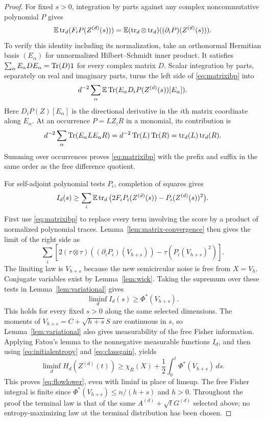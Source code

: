 \begin{proof}
For fixed $s>0$, integration by parts against any complex
noncommutative polynomial $P$ gives
\begin{equation}\label{eq:matrixibp}
 \mathbb E\operatorname{tr}_d(F_i P(Z^{(d)}(s)))
 =\mathbb E(\operatorname{tr}_d\otimes\operatorname{tr}_d)((\partial_iP)(Z^{(d)}(s))).
\end{equation}
To verify this identity including its normalization, take an orthonormal
Hermitian basis $(E_\alpha)$ for unnormalized Hilbert--Schmidt inner
product. It satisfies
$\sum_\alpha E_\alpha D E_\alpha=\operatorname{Tr}(D)1$ for every complex matrix $D$.
Scalar integration by parts, separately on real and imaginary parts,
turns the left side of \eqref{eq:matrixibp} into
\[
 d^{-2}\sum_\alpha\mathbb E\operatorname{Tr}(E_\alpha D_iP(Z^{(d)}(s))[E_\alpha]).
\]
Here $D_iP(Z)[E_\alpha]$ is the directional derivative in the $i$th
matrix coordinate along $E_\alpha$.
At an occurrence $P=LZ_iR$ in a monomial, its contribution is
\[
 d^{-2}\sum_\alpha\operatorname{Tr}(E_\alpha L E_\alpha R)
 =d^{-2}\operatorname{Tr}(L)\operatorname{Tr}(R)=\operatorname{tr}_d(L)\operatorname{tr}_d(R).
\]
Summing over occurrences proves \eqref{eq:matrixibp} with the prefix
and suffix in the same order as the free difference quotient.

For self-adjoint polynomial tests $P_i$, completion of squares gives
\[
 I_d(s)\geq\sum_i\mathbb E\operatorname{tr}_d\big(2F_iP_i(Z^{(d)}(s))
                                  -P_i(Z^{(d)}(s))^2\big).
\]
First use \eqref{eq:matrixibp} to replace every term involving the score
by a product of normalized polynomial traces. Lemma~\ref{lem:matrix-convergence}
then gives the limit of the right side as
\[
 \sum_i\left[2(\tau\otimes\tau)((\partial_iP_i)(V_{h+s}))
                         -\tau(P_i(V_{h+s})^2)\right].
\]
The limiting law is $V_{h+s}$ because the new semicircular noise is
free from $X=V_h$. Conjugate variables exist by Lemma~\ref{lem:wick}.
Taking the supremum over these tests in Lemma~\ref{lem:variational} gives
\begin{equation}\label{eq:matrix-free-fisher}
 \liminf_d I_d(s)\geq\Phi^*(V_{h+s}).
\end{equation}
This holds for every fixed $s>0$ along the same selected dimensions.
The moments of $V_{h+s}=C+\sqrt{h+s}S$ are continuous in $s$, so
Lemma~\ref{lem:variational} also gives measurability of the free Fisher
information. Applying Fatou's lemma to the nonnegative measurable
functions $I_d$, and then using \eqref{eq:initialentropy} and
\eqref{eq:classgain}, yields
\[
 \liminf_d H_d(Z^{(d)}(t))
 \geq\chi_R(X)+\frac12\int_0^t\Phi^*(V_{h+s})\,ds.
\]
This proves \eqref{eq:flowlower}, even with liminf in place of limsup.
The free Fisher integral is finite since
$\Phi^*(V_{h+s})\leq n/(h+s)$ and $h>0$. Throughout the proof the
terminal law is that of the same $A^{(d)}+\sqrt tG^{(d)}$ selected above;
no entropy-maximizing law at the terminal distribution has been chosen.
\end{proof}

